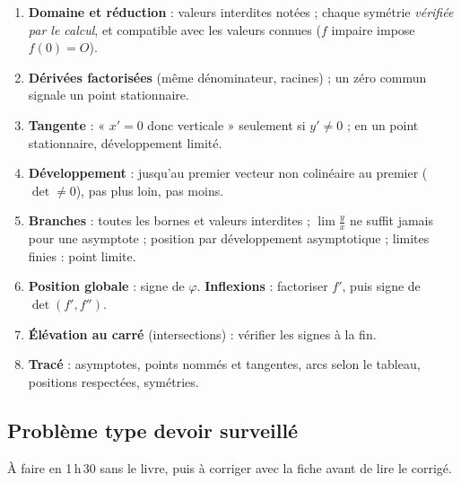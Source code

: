 \documentclass[a4paper,11pt]{article}
\numberwithin{equation}{section}
\numberwithin{figure}{section}
\numberwithin{table}{section}
\theoremstyle{enonce}
\theoremstyle{exemple}
\theoremstyle{remarque}
\begin{document}
\begin{tcolorbox}[enhanced,breakable,colback=white,colframe=Bleu,boxrule=0.6pt,arc=0pt,left=10pt,right=10pt,top=6pt,bottom=6pt]
\label{fiche:courbe}
\begin{enumerate}[leftmargin=1.4em,itemsep=0.25em]
\item \textbf{Domaine et réduction} : valeurs interdites notées ; chaque symétrie \emph{vérifiée par le calcul}, et compatible
      avec les valeurs connues ($f$ impaire impose $f(0)=O$).
\item \textbf{Dérivées factorisées} (même dénominateur, racines) ; un zéro commun signale un point stationnaire.
\item \textbf{Tangente} : « $x'=0$ donc verticale » seulement si $y'\neq0$ ; en un point stationnaire, développement limité.
\item \textbf{Développement} : jusqu'au premier vecteur non colinéaire au premier ($\det\neq0$), pas plus loin, pas moins.
\item \textbf{Branches} : toutes les bornes et valeurs interdites ; $\lim\frac yx$ ne suffit jamais pour une asymptote ; position par
      développement asymptotique ; limites finies : point limite.
\item \textbf{Position globale} : signe de $\varphi$. \textbf{Inflexions} : factoriser $f'$, puis signe de $\det(f',f'')$.
\item \textbf{Élévation au carré} (intersections) : vérifier les signes à la fin.
\item \textbf{Tracé} : asymptotes, points nommés et tangentes, arcs selon le tableau, positions respectées, symétries.
\end{enumerate}
\end{tcolorbox}

\subsection{Problème type devoir surveillé}

À faire en 1\,h\,30 sans le livre, puis à corriger avec la fiche avant de lire le corrigé.
\end{document}
